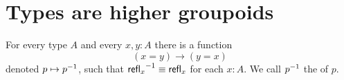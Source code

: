 \documentclass[hott-all.tex]{subfiles}
\begin{document}
%

\section{Types are higher groupoids}
\label{sec:equality}


\begin{lem}\label{lem:opp}
  For every type $A$ and every $x,y:A$ there is a function
  \begin{equation*}
    (x= y)\to(y= x)
  \end{equation*}
  denoted $p\mapsto \mathord{{p}^{-1}}$, such that $\mathord{{\mathsf{refl}_{x}}^{-1}}\equiv\mathsf{refl}_{x}$ for each $x:A$.
  We call $\mathord{{p}^{-1}}$ the  of $p$.
\end{lem}
\end{document}
